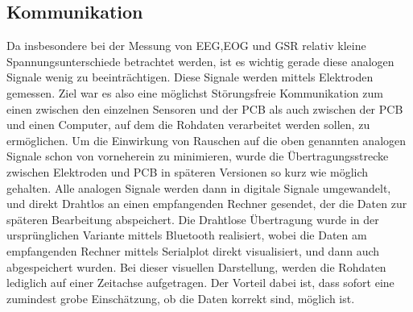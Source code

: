 \subsection{Kommunikation} \label{grund-kommunikation}


Da insbesondere bei der Messung von EEG,EOG und GSR relativ kleine Spannungsunterschiede betrachtet werden, ist es wichtig gerade diese analogen Signale wenig zu beeinträchtigen. Diese Signale werden mittels Elektroden gemessen. Ziel war es also eine möglichst Störungsfreie Kommunikation zum einen zwischen den einzelnen Sensoren und der PCB als auch zwischen der PCB und einen Computer, auf dem die Rohdaten verarbeitet werden sollen, zu ermöglichen. Um die Einwirkung von Rauschen auf die oben genannten analogen Signale schon von vorneherein zu minimieren, wurde die Übertragungsstrecke zwischen Elektroden und PCB in späteren Versionen so kurz wie möglich gehalten. Alle analogen Signale werden dann in digitale Signale umgewandelt, und direkt Drahtlos an einen empfangenden Rechner gesendet, der die Daten zur späteren Bearbeitung abspeichert. Die Drahtlose Übertragung wurde in der ursprünglichen Variante mittels Bluetooth realisiert, wobei die Daten am empfangenden Rechner mittels Serialplot direkt visualisiert, und dann auch abgespeichert wurden. Bei dieser visuellen Darstellung, werden die Rohdaten lediglich auf einer Zeitachse aufgetragen. Der Vorteil dabei ist, dass sofort eine zumindest grobe Einschätzung, ob die Daten korrekt sind, möglich ist.








